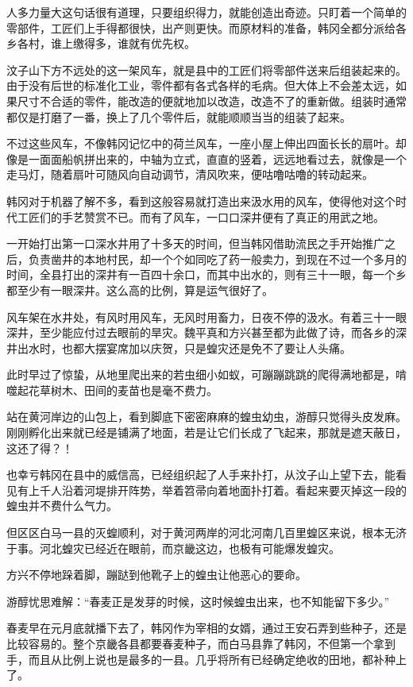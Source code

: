 人多力量大这句话很有道理，只要组织得力，就能创造出奇迹。只盯着一个简单的零部件，工匠们上手得都很快，出产则更快。而原材料的准备，韩冈全都分派给各乡各村，谁上缴得多，谁就有优先权。

汶子山下方不远处的这一架风车，就是县中的工匠们将零部件送来后组装起来的。由于没有后世的标准化工业，零件都有各式各样的毛病。但大体上不会差太远，如果尺寸不合适的零件，能改造的便就地加以改造，改造不了的重新做。组装时通常都仅是打磨了一番，换上了几个零件后，就能顺顺当当的组装了起来。

不过这些风车，不像韩冈记忆中的荷兰风车，一座小屋上伸出四面长长的扇叶。却像是一面面船帆拼出来的，中轴为立式，直直的竖着，远远地看过去，就像是一个走马灯，随着扇叶可随风向自动调节，清风吹来，便咕噜咕噜的转动起来。

韩冈对于机器了解不多，看到这般容易就打造出来汲水用的风车，使得他对这个时代工匠们的手艺赞赏不已。而有了风车，一口口深井便有了真正的用武之地。

一开始打出第一口深水井用了十多天的时间，但当韩冈借助流民之手开始推广之后，负责凿井的本地村民，却一个个如同吃了药一般卖力，到现在不过一个多月的时间，全县打出的深井有一百四十余口，而其中出水的，则有三十一眼，每一个乡都至少有一眼深井。这么高的比例，算是运气很好了。

风车架在水井处，有风时用风车，无风时用畜力，日夜不停的汲水。有着三十一眼深井，至少能应付过去眼前的旱灾。魏平真和方兴甚至都为此做了诗，而各乡的深井出水时，也都大摆宴席加以庆贺，只是蝗灾还是免不了要让人头痛。

此时早过了惊蛰，从地里爬出来的若虫细小如蚁，可蹦蹦跳跳的爬得满地都是，啃噬起花草树木、田间的麦苗也是毫不费力。

站在黄河岸边的山包上，看到脚底下密密麻麻的蝗虫幼虫，游醇只觉得头皮发麻。刚刚孵化出来就已经是铺满了地面，若是让它们长成了飞起来，那就是遮天蔽日，这还了得？！

也幸亏韩冈在县中的威信高，已经组织起了人手来扑打，从汶子山上望下去，能看见有上千人沿着河堤排开阵势，举着笤帚向着地面扑打着。看起来要灭掉这一段的蝗虫并不费什么气力。

但区区白马一县的灭蝗顺利，对于黄河两岸的河北河南几百里蝗区来说，根本无济于事。河北蝗灾已经近在眼前，而京畿这边，也极有可能爆发蝗灾。

方兴不停地跺着脚，蹦跶到他靴子上的蝗虫让他恶心的要命。

游醇忧思难解：“春麦正是发芽的时候，这时候蝗虫出来，也不知能留下多少。”

春麦早在元月底就播下去了，韩冈作为宰相的女婿，通过王安石弄到些种子，还是比较容易的。整个京畿各县都要春麦种子，而白马县靠了韩冈，不但第一个拿到手，而且从比例上说也是最多的一县。几乎将所有已经确定绝收的田地，都补种上了。

